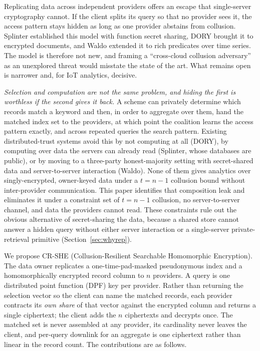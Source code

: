 \documentclass[a4paper,fleqn]{cas-sc}
\begin{document}
Replicating data across independent providers offers an escape that
single-server cryptography cannot. If the client splits its query so that no
provider sees it, the access pattern stays hidden as long as one provider
abstains from collusion. Splinter \citep{splinter} established this model with
function secret sharing, DORY \citep{dory} brought it to encrypted documents,
and Waldo \citep{waldo} extended it to rich predicates over time series. The
model is therefore not new, and framing a ``cross-cloud collusion adversary''
as an unexplored threat would misstate the state of the art. What remains open
is narrower and, for IoT analytics, decisive.

\emph{Selection and computation are not the same problem, and hiding the first
is worthless if the second gives it back.} A scheme can privately determine
which records match a keyword and then, in order to aggregate over them, hand
the matched index set to the providers, at which point the coalition learns
the access pattern exactly, and across repeated queries the search pattern.
Existing distributed-trust systems avoid this by not computing at all (DORY),
by computing over data the servers can already read (Splinter, whose databases
are public), or by moving to a three-party honest-majority setting with
secret-shared data and server-to-server interaction (Waldo). None of them
gives analytics over singly-encrypted, owner-keyed data under a $t=n-1$
collusion bound without inter-provider communication. This paper identifies
that composition leak and eliminates it under a constraint set of $t=n-1$
collusion, no server-to-server channel, and data the providers cannot read.
These constraints rule out the obvious alternative of secret-sharing the
data, because a shared store cannot answer a hidden query without either
server interaction or a single-server private-retrieval primitive
(Section~\ref{sec:whyrep}).

We propose CR-SHE (Collusion-Resilient Searchable Homomorphic Encryption). The
data owner replicates a one-time-pad-masked pseudonymous index and a
homomorphically encrypted record column to $n$ providers. A query is one
distributed point function (DPF) key per provider. Rather than returning the
selection vector so the client can name the matched records, each provider
contracts its \emph{own share} of that vector against the encrypted column and
returns a single ciphertext; the client adds the $n$ ciphertexts and decrypts
once. The matched set is never assembled at any provider, its cardinality
never leaves the client, and per-query downlink for an aggregate is one
ciphertext rather than linear in the record count. The contributions are as
follows.
\end{document}
